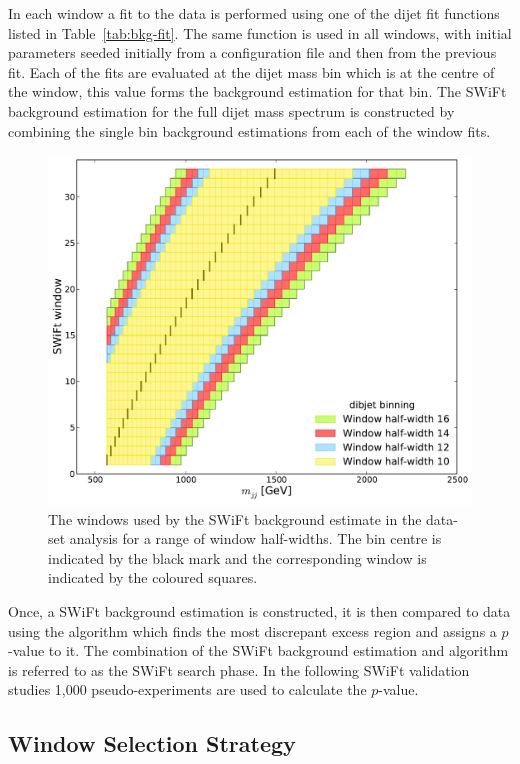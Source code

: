 In each window a fit to the data is performed using one of the dijet fit functions listed in Table~\ref{tab:bkg-fit}.
The same function is used in all windows, with initial parameters seeded initially from a configuration file and then from the previous fit.
Each of the fits are evaluated at the dijet mass bin which is at the centre of the window, this value forms the background estimation for that bin.
The SWiFt background estimation for the full dijet mass spectrum is constructed by combining the single bin background estimations from each of the window fits.

\begin{figure}[!htb]
\centering
\includegraphics[width=0.6\linewidth, angle=0]{figs/Dibjet/LowMass/evt-swiftBins_min566_fl0_fh0_tr0.pdf}
\caption{\label{fig:bkg-lm_swiftBins}
  The windows used by the SWiFt background estimate in the \lm{} data-set analysis for a range of window half-widths.
  The bin centre is indicated by the black mark and the corresponding window is indicated by the coloured squares.}
\end{figure}

Once, a SWiFt background estimation is constructed,
it is then compared to data using the \bh{} algorithm which finds the most discrepant excess region and assigns a \mbox{$p$-value} to it.
The combination of the SWiFt background estimation and \bh{} algorithm is referred to as the SWiFt search phase.
In the following SWiFt validation studies 1,000 pseudo-experiments are used to calculate the \bh{} \mbox{$p$-value}.

\subsection{Window Selection Strategy}
\label{sec:bkg-full_windowSel}

